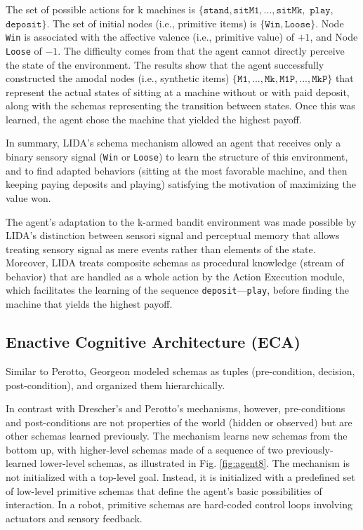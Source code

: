 \documentclass[runningheads]{llncs}
\begin{document}
The set of possible actions for k machines is $\{ \texttt{stand}, \texttt{sitM1},..., \texttt{sitMk},$ $\texttt{play},$ $\texttt{deposit}\}$. 
The set of initial nodes (i.e., primitive items) is $\{\texttt{Win}, \texttt{Loose} \}$.
Node \texttt{Win} is associated with the affective valence (i.e., primitive value) of $+1$, and Node \texttt{Loose} of $-1$.   
The difficulty comes from that the agent cannot directly perceive the state of the environment.
The results show that the agent successfully constructed the amodal nodes (i.e., synthetic items) $\{ \texttt{M1},  ..., \texttt{Mk}, \texttt{M1P}, ...,  \texttt{MkP} \}$ that represent the actual states of sitting at a machine without or with paid deposit, along with the schemas representing the transition between states. 
Once this was learned, the agent chose the machine that yielded the highest payoff.

In summary, LIDA's schema mechanism allowed an agent that receives only a binary sensory signal (\texttt{Win} or \texttt{Loose}) to learn the structure of this environment, and to find adapted behaviors (sitting at the most favorable machine, and then keeping paying deposits and playing) satisfying the motivation of maximizing the value won. 

The agent's adaptation to the k-armed bandit environment was made possible by LIDA's distinction between sensori signal and perceptual memory that allows treating sensory signal as mere events rather than elements of the state. 
Moreover, LIDA treats composite schemas as procedural knowledge (stream of behavior) that are handled as a whole action by the Action Execution module, which facilitates the learning of the sequence \texttt{deposit}---\texttt{play}, before finding the machine that yields the highest payoff. 

\subsection{Enactive Cognitive Architecture (ECA)}

Similar to Perotto, Georgeon modeled schemas as tuples (pre-condition, decision, post-condition), and organized them  hierarchically. 

In contrast with Drescher's and Perotto's mechanisms, however, pre-conditions and post-conditions are not properties of the world (hidden or observed) but are other schemas learned previously. 
The mechanism learns new schemas from the bottom up, with higher-level schemas made of a sequence of two previously-learned lower-level schemas, 
as illustrated in Fig. \ref{fig:agent8}. 
The mechanism is not initialized with a top-level goal. 
Instead, it is initialized with a predefined set of low-level primitive schemas that define the agent's basic possibilities of interaction. 
In a robot, primitive schemas are hard-coded control loops involving actuators and sensory feedback. 
\end{document}
